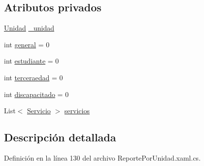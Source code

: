 \subsection*{Atributos privados}
\begin{DoxyCompactItemize}
\item 
\hyperlink{class_proyecto___integrador__3_1_1_tipos_dato_1_1_unidad}{Unidad} \hyperlink{class_proyecto___integrador__3_1_1_reportes_1_1_reporte_por_unidad_1_1_reporte_de_unidad_aab1b6d38fcca26f0ea36a0ef7285d90e}{\-\_\-unidad}
\item 
int \hyperlink{class_proyecto___integrador__3_1_1_reportes_1_1_reporte_por_unidad_1_1_reporte_de_unidad_a9e0e8780e5b3f5f6d09c96c104732388}{general} = 0
\item 
int \hyperlink{class_proyecto___integrador__3_1_1_reportes_1_1_reporte_por_unidad_1_1_reporte_de_unidad_a1f6de144584bd3705d824d4f06dd6cf0}{estudiante} = 0
\item 
int \hyperlink{class_proyecto___integrador__3_1_1_reportes_1_1_reporte_por_unidad_1_1_reporte_de_unidad_a4d2da0add4a77d8ed5cc5c330668a2f5}{terceraedad} = 0
\item 
int \hyperlink{class_proyecto___integrador__3_1_1_reportes_1_1_reporte_por_unidad_1_1_reporte_de_unidad_a8b1b43b2d7a81d3b06a588eac0ecea6f}{discapacitado} = 0
\item 
List$<$ \hyperlink{class_proyecto___integrador__3_1_1_tipos_dato_1_1_servicio}{Servicio} $>$ \hyperlink{class_proyecto___integrador__3_1_1_reportes_1_1_reporte_por_unidad_1_1_reporte_de_unidad_a527d8262f236a73916ca9717fdb1335d}{servicios}
\end{DoxyCompactItemize}


\subsection{Descripción detallada}


Definición en la línea 130 del archivo Reporte\-Por\-Unidad.\-xaml.\-cs.



